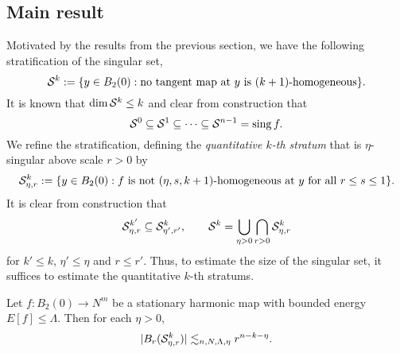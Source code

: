 	
\subsection{Main result}

Motivated by the results from the previous section, we have the following stratification of the singular set, 
	\[ \mathcal S^k := \{ y \in B_2 (0) : \text{no tangent map at $y$ is $(k + 1)$-homogeneous}\}. \]
It is known that $\dim \mathcal S^k \leq k$ and clear from construction that
	\[ \mathcal S^0 \subseteq \mathcal S^1 \subseteq \dots \subseteq \mathcal S^{n - 1} = \operatorname{sing} f. \]
We refine the stratification, defining the \emph{quantitative $k$-th stratum} that is $\eta$-singular above scale $r > 0$ by 
	\[ \mathcal S^k_{\eta, r} := \{ y \in B_2 (0) :  \text{$f$ is not $(\eta, s, k + 1)$-homogeneous at $y$ for all $r \leq s \leq 1$}  \}. \]	
It is clear from construction that
	\[ \mathcal S^{k'}_{\eta, r} \subseteq \mathcal S^k_{\eta', r'} , \qquad \mathcal S^k = \bigcup_{\eta > 0} \bigcap_{r > 0} \mathcal S^k_{\eta, r}\]
for $k' \leq k$, $\eta' \leq \eta$ and $r \leq r'$. Thus, to estimate the size of the singular set, it suffices to estimate the quantitative $k$-th stratums.
	
\begin{theorem}
	Let $f: B_2 (0) \to N^m$ be a stationary harmonic map with bounded energy $E[f] \leq \Lambda$. Then for each $\eta > 0$,  
		\[ |B_r (\mathcal S^k_{\eta, r})| \lesssim_{n, N, \Lambda, \eta} r^{n - k - \eta}. \]
		\label{thm:strat}
\end{theorem}
